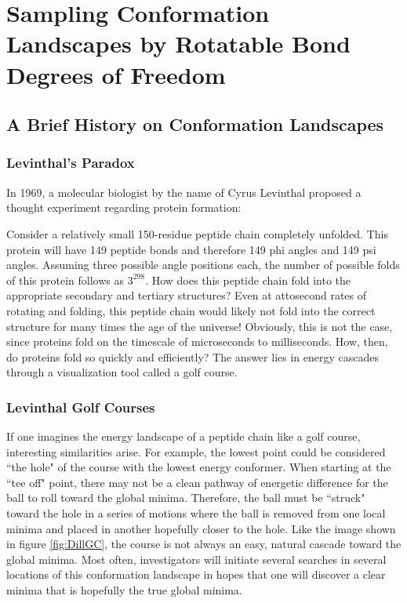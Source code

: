 \chapter{Sampling Conformation Landscapes by Rotatable Bond Degrees of Freedom}
\label{ch:ConformationLandscape}

\section{A Brief History on Conformation Landscapes}

\subsection{Levinthal's Paradox}

In 1969, a molecular biologist by the name of Cyrus Levinthal proposed a thought experiment regarding protein formation\cite{Levinthal}:

Consider a relatively small 150-residue peptide chain completely unfolded.
This protein will have 149 peptide bonds and therefore 149 phi angles and 149 psi angles. 
Assuming three possible angle positions each, the number of possible folds of this protein follows as $3^{298}$.
How does this peptide chain fold into the appropriate secondary and tertiary structures? 
Even at attosecond rates of rotating and folding, this peptide chain would likely not fold into the correct structure for many times the age of the universe!
Obviously, this is not the case, since proteins fold on the timescale of microseconds to milliseconds.\cite{LevParadoxCalculated}
How, then, do proteins fold so quickly and efficiently?
The answer lies in energy cascades through a visualization tool called a golf course.

\subsection{Levinthal Golf Courses}

If one imagines the energy landscape of a peptide chain like a golf course, interesting similarities arise.
For example, the lowest point could be considered ``the hole" of the course with the lowest energy conformer. 
When starting at the ``tee off" point, there may not be a clean pathway of energetic difference for the ball to roll toward the global minima.
Therefore, the ball must be ``struck" toward the hole in a series of motions where the ball is removed from one local minima and placed in another hopefully closer to the hole. 
Like the image shown in figure \ref{fig:DillGC}, the course is not always an easy, natural cascade toward the global minima.
Most often, investigators will initiate several searches in several locations of this conformation landscape in hopes that one will discover a clear minima that is hopefully the true global minima.

